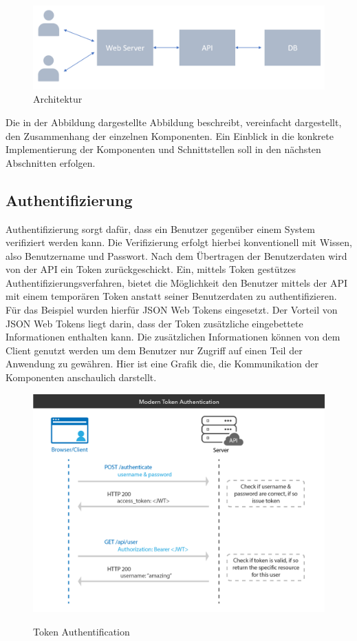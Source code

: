 \documentclass[utf8,biblatex]{lni}
\begin{document}
\begin{figure}
  \centering
  \includegraphics[width=\textwidth]{images/architektur.png}
  \caption[Architektur]{Architektur} 
  \label{Architektur}
\end{figure} 

Die in der Abbildung dargestellte Abbildung beschreibt, vereinfacht dargestellt, den Zusammenhang der einzelnen Komponenten. 
Ein Einblick in die konkrete Implementierung der Komponenten und Schnittstellen soll in den nächsten Abschnitten erfolgen. 

\subsection{Authentifizierung}

Authentifizierung sorgt dafür, dass ein Benutzer gegenüber einem System verifiziert werden kann.
Die Verifizierung erfolgt hierbei konventionell mit Wissen, also Benutzername und Passwort.
Nach dem Übertragen der Benutzerdaten wird von der API ein Token zurückgeschickt.
Ein, mittels Token gestützes Authentifizierungsverfahren, bietet die Möglichkeit den Benutzer mittels 
der API mit einem temporären Token anstatt seiner Benutzerdaten zu authentifizieren. 
Für das Beispiel wurden hierfür JSON Web Tokens \cite{JWT} eingesetzt. 
Der Vorteil von JSON Web Tokens liegt darin, dass der Token zusätzliche eingebettete Informationen
enthalten kann. 
Die zusätzlichen Informationen können von dem Client genutzt werden um dem Benutzer 
nur Zugriff auf einen Teil der Anwendung zu gewähren. 
Hier ist eine Grafik die, die Kommunikation der Komponenten anschaulich darstellt.

\begin{figure}
  \centering
  \includegraphics[width=\textwidth]{images/token-auth.png}
  \caption[Token Authentification]{Token Authentification} 
  \label{token-auth}
  \cite{OktaJWTAuth}
\end{figure} 
\end{document}
